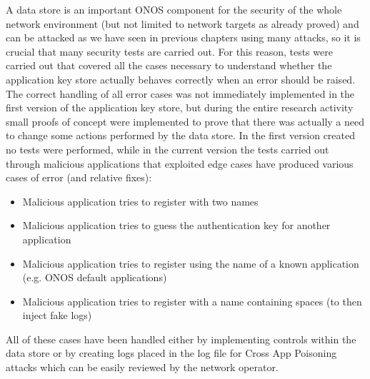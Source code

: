 \documentclass[a4paper,10pt]{memoir}
\begin{document}
A data store is an important ONOS component for the security of the whole network environment (but not limited to network targets as already proved) and can be attacked as we have seen in previous chapters using many attacks, so it is crucial that many security tests are carried out. For this reason, tests were carried out that covered all the cases necessary to understand whether the application key store actually behaves correctly when an error should be raised. The correct handling of all error cases was not immediately implemented in the first version of the application key store, but during the entire research activity small proofs of concept were implemented to prove that there was actually a need to change some actions performed by the data store. In the first version created no tests were performed, while in the current version the tests carried out through malicious applications that exploited edge cases have produced various cases of error (and relative fixes):
\begin{itemize}
\item Malicious application tries to register with two names
\item Malicious application tries to guess the authentication key for another application
\item Malicious application tries to register using the name of a known application (e.g. ONOS default applications)
\item Malicious application tries to register with a name containing spaces (to then inject fake logs)
\end{itemize}
All of these cases have been handled either by implementing controls within the data store or by creating logs placed in the log file for Cross App Poisoning attacks which can be easily reviewed by the network operator.
\medskip
\end{document}
